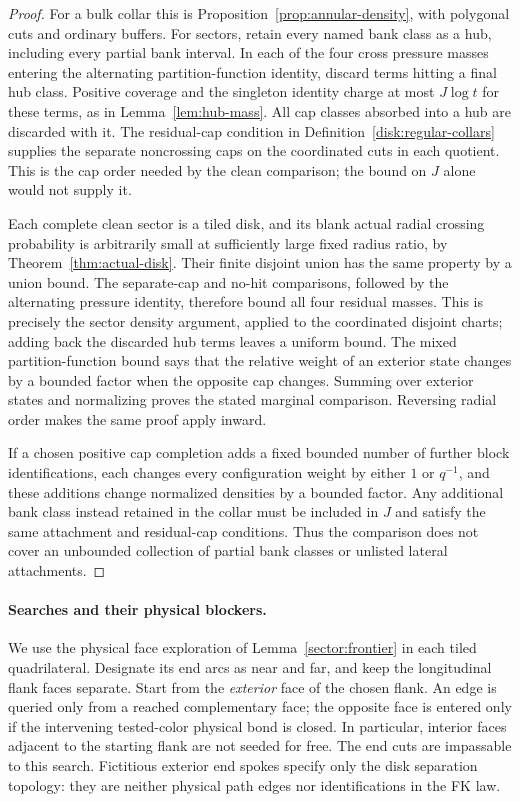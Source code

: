 \begin{proof}
For a bulk collar this is Proposition~\ref{prop:annular-density}, with
polygonal cuts and ordinary buffers. For sectors, retain every named
bank class as a hub, including every partial bank interval. In each of
the four cross pressure masses entering the alternating
partition-function identity, discard terms hitting a final hub class.
Positive coverage and the singleton identity charge at most $J\log t$
for these terms, as in Lemma~\ref{lem:hub-mass}. All cap classes
absorbed into a hub are discarded with it. The residual-cap condition
in Definition~\ref{disk:regular-collars} supplies the separate
noncrossing caps on the coordinated cuts in each quotient. This is the
cap order needed by the clean comparison; the bound on $J$ alone would
not supply it.

Each complete clean sector is a tiled disk, and its blank actual radial
crossing probability is arbitrarily small at sufficiently large fixed
radius ratio, by Theorem~\ref{thm:actual-disk}. Their finite disjoint
union has the same property by a union bound. The separate-cap and
no-hit comparisons, followed by the alternating pressure identity,
therefore bound all four residual masses. This is precisely the sector
density argument, applied to the coordinated disjoint charts; adding
back the discarded hub terms leaves a uniform bound. The mixed
partition-function bound says that the relative weight of an exterior
state changes by a bounded factor when the opposite cap changes.
Summing over exterior states and normalizing proves the stated marginal
comparison. Reversing radial order makes the same proof apply inward.

If a chosen positive cap completion adds a fixed bounded number of
further block identifications, each changes every configuration weight
by either $1$ or $q^{-1}$, and these additions change normalized
densities by a bounded factor. Any additional bank class instead
retained in the collar must be included in $J$ and satisfy the same
attachment and residual-cap conditions. Thus the comparison does not
cover an unbounded collection of partial bank classes or unlisted
lateral attachments.
\end{proof}

\paragraph{Searches and their physical blockers.}
We use the physical face exploration of Lemma~\ref{sector:frontier}
in each tiled quadrilateral. Designate its end arcs as near and far,
and keep the longitudinal flank faces separate. Start from the
\emph{exterior} face of the chosen flank. An edge is queried only from
a reached complementary face; the opposite face is entered only if
the intervening tested-color physical bond is closed. In particular,
interior faces adjacent to the starting flank are not seeded for free.
The end cuts are impassable to this search. Fictitious exterior end
spokes specify only the disk separation topology: they are neither
physical path edges nor identifications in the FK law.

